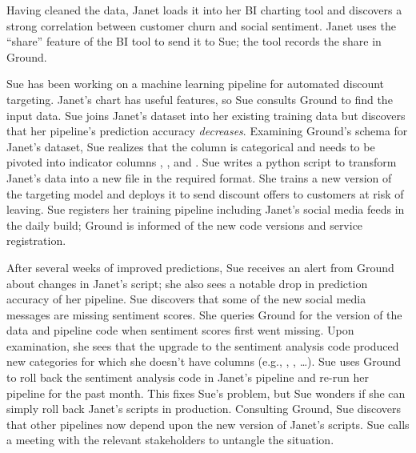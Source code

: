 \documentclass{sig-alternate}
\begin{document}
Having cleaned the data, Janet loads it into her BI charting tool and discovers a strong correlation between customer churn and social sentiment. 
Janet uses the ``share'' feature of the BI tool to send it to Sue; the tool records the share in Ground.


Sue has been working on a machine learning pipeline for automated discount targeting. Janet's chart has useful features, so Sue consults Ground to find the input data.
Sue joins Janet's dataset into her existing training data but discovers that her pipeline's prediction accuracy \emph{decreases}.  
Examining Ground's schema for Janet's dataset, Sue realizes that the  column is categorical and needs to be pivoted into indicator columns , , and . 
Sue writes a python script to transform Janet's data into a new file in the required format.
She trains a new version of the targeting model and deploys it to send discount offers to customers at risk of leaving.
Sue registers her training pipeline including Janet's social media feeds in the daily build; Ground is informed of the new code versions and service registration.

After several weeks of improved predictions, Sue receives an alert from Ground about changes in Janet's script; she also sees a notable drop in prediction accuracy of her pipeline. 
Sue discovers that some of the new social media messages are missing sentiment scores.
She queries Ground for the version of the data and pipeline code when sentiment scores first went missing.
Upon examination, she sees that the upgrade to the sentiment analysis code produced new categories for which she doesn't have columns (e.g., , , \ldots).
Sue uses Ground to roll back the sentiment analysis code in Janet's pipeline and re-run her pipeline for the past month.  
This fixes Sue's problem, but Sue wonders if she can simply roll back Janet's scripts in production. 
Consulting Ground, Sue discovers that other pipelines now depend upon the new version of Janet's scripts.
Sue calls a meeting with the relevant stakeholders to untangle the situation.


\end{document}
